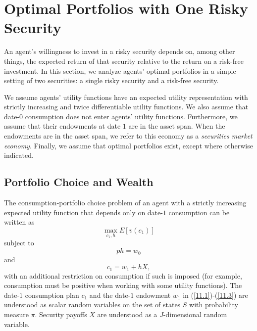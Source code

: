 \documentclass[\topdir/lecture\_notes.tex]{subfiles}
\begin{document}
\section{Optimal Portfolios with One Risky Security}
An agent's willingness to invest in a risky security depends on, among other things, the expected return of that security relative to the return on a risk-free investment. In this section,  we analyze agents' optimal portfolios in a simple setting of two securities: a single risky security and a risk-free security.

We assume agents' utility functions have an expected utility representation with strictly increasing and twice differentiable utility functions. We also assume that date-$0$ consumption does not enter agents' utility functions. Furthermore, we assume that their endowments at date $1$ are in the asset span. When the endowments are in the asset span, we refer to this economy as a \emph{securities market economy}. Finally, we assume that optimal portfolios exist, except where otherwise indicated.

\subsection{Portfolio Choice and Wealth}
The consumption-portfolio choice problem of an agent with a strictly increasing expected utility function that depends only on date-$1$ consumption can be written as
\begin{equation}
\max_{c_{1}, h} E[v(c_{1})] \label{eq:consumption_portfolio_problem} 
\end{equation}
subject to
\begin{equation}
p h=w_{0} \label{11.1}
\end{equation}
and
\begin{equation}
c_{1}=w_{1}+h X, \label{11.2}
\end{equation}
with an additional restriction on consumption if such is imposed (for example, consumption must be positive when working with some utility functions). The date-$1$ consumption plan $c_{1}$ and the date-$1$ endowment $w_{1}$ in (\ref{11.1})-(\ref{11.3}) are understood as scalar random variables on the set of states $S$ with probability measure $\pi$. Security payoffs $X$ are understood as a $J$-dimensional random variable.
\end{document}
